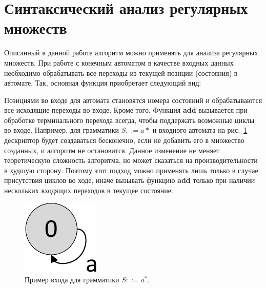 







\section{Синтаксический анализ регулярных множеств}

Описанный в данной работе алгоритм можно применять для анализа регулярных множеств.
При работе с конечным автоматом в качестве входных данных необходимо обрабатывать все переходы из текущей позиции (состояния) в автомате.
Так, основная функция приобретает следующий вид:

Позициями во входе для автомата становятся номера состояний и обрабатываются все исходящие переходы во входе. Кроме того,    
Функция \textbf{add} вызывается при обработке терминального перехода всегда, чтобы поддержать возможные циклы во входе.
Например, для грамматики $S ::= a*$ и входного автомата на рис.~\ref{graphEx}
дескриптор будет создаваться бесконечно, если не добавить его в множество созданных, и алгоритм не остановится.
Данное изменение не меняет теоретическую сложность алгоритма, но может сказаться на производительности в худшую сторону.
Поэтому этот подход можно применять лишь только в случае присутствия циклов во ходе, иначе вызывать функцию \textbf{add}
только при наличии нескольких входящих переходов в текущее состояние.

\begin{figure}%
	\centering
	\includegraphics[scale=.5]{./Gorohov/pictures/graphEx.pdf}
	\caption{Пример входа для грамматики $S ::= a^*$.}
	\label{graphEx}
\end{figure}

